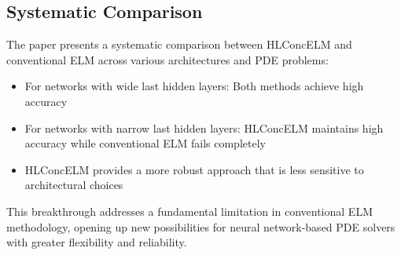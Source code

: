 \documentclass[11pt,a4paper]{article}
\begin{document}
\subsection{Systematic Comparison}

The paper presents a systematic comparison between HLConcELM and conventional ELM across various architectures and PDE problems:

\begin{itemize}
    \item For networks with wide last hidden layers: Both methods achieve high accuracy
    \item For networks with narrow last hidden layers: HLConcELM maintains high accuracy while conventional ELM fails completely
    \item HLConcELM provides a more robust approach that is less sensitive to architectural choices
\end{itemize}

This breakthrough addresses a fundamental limitation in conventional ELM methodology, opening up new possibilities for neural network-based PDE solvers with greater flexibility and reliability.
\end{document}
